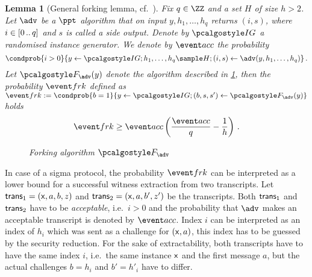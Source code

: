 \let\accentvec\vec \documentclass[runningheads,10pt]{llncs}
\newtheorem{lemma}[theorem]{Lemma}
\begin{document}
\begin{lemma}[General forking lemma, cf.~\cite{INDOCRYPT:FKMV12,CCS:BelNev06}]
	\label{lem:forking_lemma}
	Fix $q \in \ZZ$ and a set $H$ of size $h > 2$. Let $\adv$ be a $\ppt$ algorithm that on input $y, h_1, \ldots, h_q$ returns $(i, s)$, where $i \in[0 \, .. \, q]$ and $s$ is called a \emph{side output}.
	Denote by $\ig$ a randomised instance generator.
	We denote by $\accProb$ the probability
	\[
		\condprob{i > 0}{y \gets \ig; h_1, \ldots, h_q \sample H; (i, s) \gets \adv(y, h_1, \ldots, h_q)}\,.
	\]
	Let $\forking_\adv(y)$ denote the algorithm described in \cref{fig:forking_lemma}, then the probability $\frkProb$ defined as
	$
		\frkProb := \condprob{b = 1}{y \gets \ig; (b, s, s') \gets \forking_{\adv}(y)}
	$
	holds
	\[
		\frkProb \geq \accProb \brak{\frac{\accProb}{q} - \frac{1}{h}}\,.
	\]
	\begin{figure}[t]
		\centering
		\caption{Forking algorithm $\forking_\adv$}
		\label{fig:forking_lemma}
\end{figure}
\end{lemma}
%
In case of a sigma protocol, the probability $\frkProb$ can be interpreted as
a lower bound for a successful witness extraction from two transcripts.  Let
$\mathsf{trans}_1 = (\mathsf{x}, a, b, z)$ and $\mathsf{trans}_2 = (\mathsf{x}, a, b', z')$ be the
transcripts.  Both $\mathsf{trans}_1$ and $\mathsf{trans}_2$ have to be \emph{acceptable},
i.e.~$i > 0$ and the probability that $\adv$ makes an acceptable transcript is
denoted by $\accProb$.  Index $i$ can be interpreted as an index of $h_i$
which was sent as a challenge for $(\mathsf{x}, a)$, this index has to be guessed by
the security reduction.  For the sake of extractability, both transcripts have
to have the same index $i$, i.e.~the same instance $\mathsf{x}$ and the first
message $a$, but the actual challenges $b = h_i$ and $b' = h'_{i}$ have to
differ.
\end{document}
